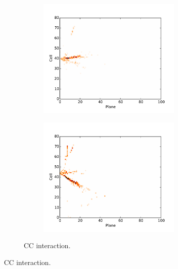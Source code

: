 \begin{figure}[t]
\begin{subfigure}[c]{\textwidth}
\centering
\begin{subfigure}[c]{0.47\textwidth}
\includegraphics[width=\textwidth]{figures/cnn/view_truetype6_caltype6_event155_x.pdf}
\vspace{-20pt}
\caption*{\xview}
\end{subfigure}
\begin{subfigure}[c]{0.47\textwidth}
\includegraphics[width=\textwidth]{figures/cnn/view_truetype6_caltype6_event155_y.pdf}
\vspace{-20pt}
\caption*{\yview}
\end{subfigure}
\vspace{-10pt}
\caption{\nue CC interaction.}
\label{pixnue}
\end{subfigure}


\end{figure}
